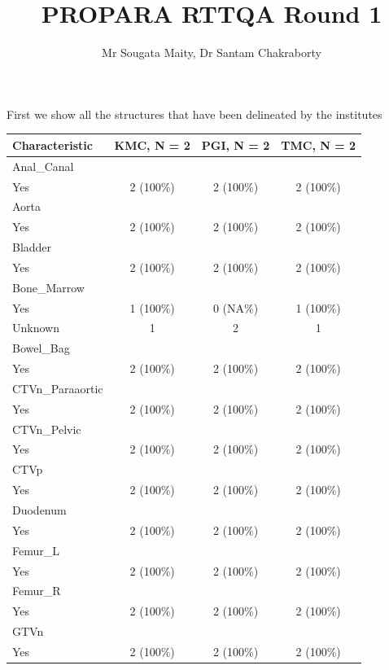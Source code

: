 \documentclass[
  letterpaper,
  DIV=11,
  numbers=noendperiod]{scrartcl}
\title{PROPARA RTTQA Round 1}
\author{Mr Sougata Maity, Dr Santam Chakraborty}
\date{}
\begin{document}
\maketitle
\ifdefined\Shaded\renewenvironment{Shaded}{\begin{tcolorbox}[breakable, boxrule=0pt, frame hidden, sharp corners, enhanced, interior hidden, borderline west={3pt}{0pt}{shadecolor}]}{\end{tcolorbox}}\fi

First we show all the structures that have been delineated by the
institutes

\begin{longtable}[]{@{}lccc@{}}
\toprule\noalign{}
\textbf{Characteristic} & \textbf{KMC}, N = 2 & \textbf{PGI}, N = 2 &
\textbf{TMC}, N = 2 \\
\midrule\noalign{}
\endhead
\bottomrule\noalign{}
\endlastfoot
Anal\_Canal & & & \\
Yes & 2 (100\%) & 2 (100\%) & 2 (100\%) \\
Aorta & & & \\
Yes & 2 (100\%) & 2 (100\%) & 2 (100\%) \\
Bladder & & & \\
Yes & 2 (100\%) & 2 (100\%) & 2 (100\%) \\
Bone\_Marrow & & & \\
Yes & 1 (100\%) & 0 (NA\%) & 1 (100\%) \\
Unknown & 1 & 2 & 1 \\
Bowel\_Bag & & & \\
Yes & 2 (100\%) & 2 (100\%) & 2 (100\%) \\
CTVn\_Paraaortic & & & \\
Yes & 2 (100\%) & 2 (100\%) & 2 (100\%) \\
CTVn\_Pelvic & & & \\
Yes & 2 (100\%) & 2 (100\%) & 2 (100\%) \\
CTVp & & & \\
Yes & 2 (100\%) & 2 (100\%) & 2 (100\%) \\
Duodenum & & & \\
Yes & 2 (100\%) & 2 (100\%) & 2 (100\%) \\
Femur\_L & & & \\
Yes & 2 (100\%) & 2 (100\%) & 2 (100\%) \\
Femur\_R & & & \\
Yes & 2 (100\%) & 2 (100\%) & 2 (100\%) \\
GTVn & & & \\
Yes & 2 (100\%) & 2 (100\%) & 2 (100\%) \\

\end{longtable}
\end{document}
